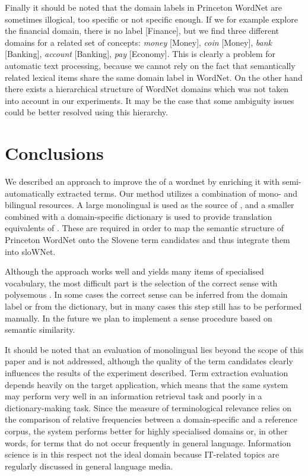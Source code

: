 \documentclass[output=paper]{LSP/langsci}
\begin{document}
Finally it should be noted that the domain labels in Princeton WordNet are sometimes illogical, too specific or not specific enough. If we for example explore the financial domain, there is no label [Finance], but we find three different domains for a related set of concepts: \textit{money} [Money], \textit{coin} [Money], \textit{bank} [Banking], \textit{account} [Banking], \textit{pay} [Economy]. This is clearly a problem for automatic text processing, because we cannot rely on the fact that semantically related lexical items share the same domain label in WordNet. On the other hand there exists a hierarchical structure of WordNet domains which was not taken into account in our experiments. It may be the case that some ambiguity issues could be better resolved using this hierarchy.

\section{Conclusions}\label{sec:vintar:6}

We described an approach to improve the  of a wordnet by enriching it with semi-automatically extracted  terms. Our method utilizes a combination of mono- and bilingual resources. A large monolingual  is used as the source of , and a smaller  combined with a domain-specific dictionary is used to provide translation equivalents of . These are required in order to map the semantic structure of Princeton WordNet onto the Slovene term candidates and thus integrate them into sloWNet. 

Although the approach works well and yields many items of specialised vocabulary, the most difficult part is the selection of the correct sense with polysemous . In some cases the correct sense can be inferred from the domain label or from the dictionary, but in many cases this step still has to be performed manually. In the future we plan to implement a sense  procedure based on semantic similarity.

It should be noted that an evaluation of monolingual  lies beyond the scope of this paper and is not addressed, although the quality of the term candidates clearly influences the results of the experiment described. Term extraction evaluation depends heavily on the target application, which means that the same system may perform very well in an information retrieval task and poorly in a dictionary-making task. Since the measure of terminological relevance relies on the comparison of relative frequencies between a domain-specific and a reference corpus, the  system performs better for highly specialised domains or, in other words, for terms that do not occur frequently in general language. Information science is in this respect not the ideal domain because IT-related topics are regularly discussed in general language media.
\end{document}
